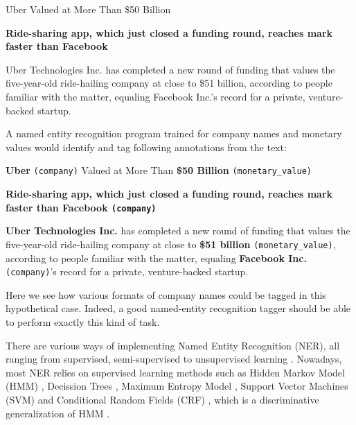 \begin{displayquote}
{\Large Uber Valued at More Than \$50 Billion}


\textbf{Ride-sharing app, which just closed a funding round, reaches mark faster than Facebook}

Uber Technologies Inc. has completed a new round of funding that values the five-year-old ride-hailing company at close to \$51 billion, according to people familiar with the matter, equaling Facebook Inc.’s record for a private, venture-backed startup.

\end{displayquote}

A named entity recognition program trained for company names and monetary values would identify and tag following annotations from the text:

\begin{displayquote}
{\Large \textbf{Uber} \texttt{(company)} Valued at More Than  \textbf{\$50 Billion } \texttt{(monetary\_value)}}


\textbf{Ride-sharing app, which just closed a funding round, reaches mark faster than \textbf{Facebook} \texttt{(company)}}

\textbf{Uber Technologies Inc.} has completed a new round of funding that values the five-year-old ride-hailing company at close to \textbf{\$51 billion} \texttt{(monetary\_value)}, according to people familiar with the matter, equaling \textbf{Facebook Inc.} \texttt{(company)}’s record for a private, venture-backed startup.

\end{displayquote}

Here we see how various formats of company names could be tagged in this hypothetical case. Indeed, a good named-entity recognition tagger should be able to perform exactly this kind of task.

There are various ways of implementing Named Entity Recognition (NER), all ranging from supervised, semi-supervised to unsupervised learning \citep{nadeau2007survey}. Nowadays, most NER relies on supervised learning methods \citep{nadeau2007survey} such as Hidden Markov Model (HMM) \citep{bikel1997nymble}, Decission Trees \citep{sekine1998decision}, Maximum Entropy Model \citep{borthwick1998exploiting}, Support
Vector Machines (SVM) \citep{asahara2003japanese} and Conditional Random Fields (CRF) \citep{mccallum2003early}, which is a discriminative generalization of HMM \citep{lafferty2001conditional}.


